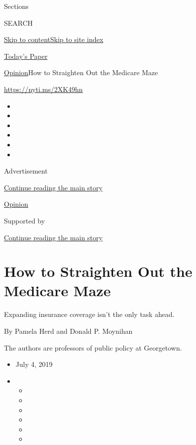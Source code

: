 Sections

SEARCH

\protect\hyperlink{site-content}{Skip to
content}\protect\hyperlink{site-index}{Skip to site index}

\href{https://myaccount.nytimes3xbfgragh.onion/auth/login?response_type=cookie\&client_id=vi}{}

\href{https://www.nytimes3xbfgragh.onion/section/todayspaper}{Today's
Paper}

\href{/section/opinion}{Opinion}\textbar{}How to Straighten Out the
Medicare Maze

\url{https://nyti.ms/2XK49hn}

\begin{itemize}
\item
\item
\item
\item
\item
\item
\end{itemize}

Advertisement

\protect\hyperlink{after-top}{Continue reading the main story}

\href{/section/opinion}{Opinion}

Supported by

\protect\hyperlink{after-sponsor}{Continue reading the main story}

\hypertarget{how-to-straighten-out-the-medicare-maze}{%
\section{How to Straighten Out the Medicare
Maze}\label{how-to-straighten-out-the-medicare-maze}}

Expanding insurance coverage isn't the only task ahead.

By Pamela Herd and Donald P. Moynihan

The authors are professors of public policy at Georgetown.

\begin{itemize}
\item
  July 4, 2019
\item
  \begin{itemize}
  \item
  \item
  \item
  \item
  \item
  \item
  \end{itemize}
\end{itemize}


